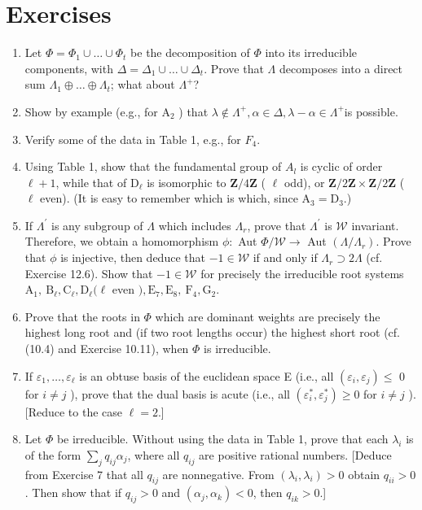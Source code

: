 \documentclass[10pt]{article}
\begin{document}
\section*{Exercises}
\begin{enumerate}
  \item Let $\Phi=\Phi_{1} \cup \ldots \cup \Phi_{t}$ be the decomposition of $\Phi$ into its irreducible components, with $\Delta=\Delta_{1} \cup \ldots \cup \Delta_{t}$. Prove that $\Lambda$ decomposes into a direct sum $\Lambda_{1} \oplus \ldots \oplus \Lambda_{t}$; what about $\Lambda^{+}$?
  \item Show by example (e.g., for $\mathrm{A}_{2}$ ) that $\lambda \notin \Lambda^{+}, \alpha \in \Delta, \lambda-\alpha \in \Lambda^{+}$is possible.
  \item Verify some of the data in Table 1, e.g., for $F_{4}$.
  \item Using Table 1, show that the fundamental group of $A_{l}$ is cyclic of order $\ell+1$, while that of $\mathrm{D}_{\ell}$ is isomorphic to $\mathbf{Z} / 4 \mathbf{Z}$ ( $\ell$ odd), or $\mathbf{Z} / 2 \mathbf{Z} \times \mathbf{Z} / 2 \mathbf{Z}$ ( $\ell$ even). (It is easy to remember which is which, since $\mathrm{A}_{3}=\mathrm{D}_{3}$.)
  \item If $\Lambda^{\prime}$ is any subgroup of $\Lambda$ which includes $\Lambda_{r}$, prove that $\Lambda^{\prime}$ is $\mathscr{W}$ invariant. Therefore, we obtain a homomorphism $\phi:$ Aut $\Phi / \mathscr{W} \rightarrow$ Aut $\left(\Lambda / \Lambda_{r}\right)$. Prove that $\phi$ is injective, then deduce that $-1 \in \mathscr{W}$ if and only if $\Lambda_{r} \supset 2 \Lambda$ (cf. Exercise 12.6). Show that $-1 \in \mathscr{W}$ for precisely the irreducible root systems $\mathrm{A}_{1}, \mathrm{~B}_{\ell}, \mathrm{C}_{\ell}, \mathrm{D}_{\ell}(\ell$ even $), \mathrm{E}_{7}, \mathrm{E}_{8}, \mathrm{~F}_{4}, \mathrm{G}_{2}$.
  \item Prove that the roots in $\Phi$ which are dominant weights are precisely the highest long root and (if two root lengths occur) the highest short root (cf. (10.4) and Exercise 10.11), when $\Phi$ is irreducible.
  \item If $\varepsilon_{1}, \ldots, \varepsilon_{\ell}$ is an obtuse basis of the euclidean space E (i.e., all $\left(\varepsilon_{i}, \varepsilon_{j}\right) \leq$ 0 for $i \neq j$ ), prove that the dual basis is acute (i.e., all $\left(\varepsilon_{i}^{*}, \varepsilon_{j}^{*}\right) \geq 0$ for $i \neq j$ ). [Reduce to the case $\ell=2$.]
  \item Let $\Phi$ be irreducible. Without using the data in Table 1, prove that each $\lambda_{i}$ is of the form $\sum_{j} q_{i j} \alpha_{j}$, where all $q_{i j}$ are positive rational numbers. [Deduce from Exercise 7 that all $q_{i j}$ are nonnegative. From $\left(\lambda_{i}, \lambda_{i}\right)>0$ obtain $q_{i i}>0$. Then show that if $q_{i j}>0$ and $\left(\alpha_{j}, \alpha_{k}\right)<0$, then $q_{i k}>0$.]

\end{enumerate}
\end{document}
